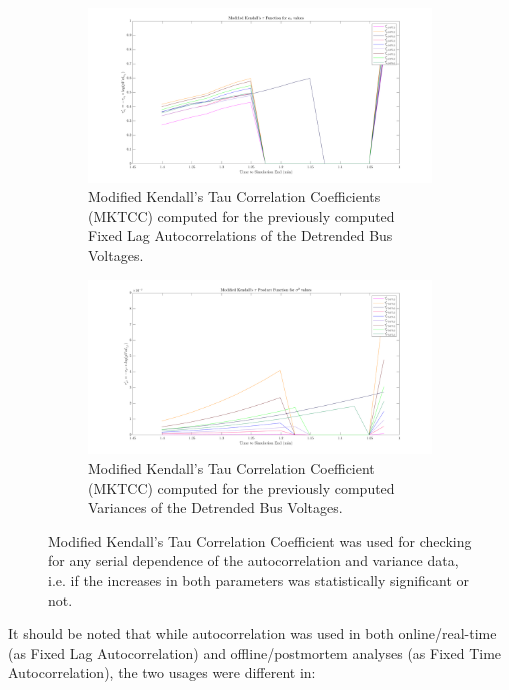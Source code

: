 \begin{figure}[!htpb]
	\begin{subfigure}{\textwidth}
		\centering
		\includegraphics[scale=0.25]{../figures/analysis_matlab/mktcc_ar1_run02}
		\caption{Modified Kendall's Tau Correlation Coefficients (MKTCC) computed for the previously computed Fixed Lag Autocorrelations of the Detrended Bus Voltages.}
	\end{subfigure}
	
	\begin{subfigure}{\textwidth}
		\centering
		\includegraphics[scale=0.25]{../figures/analysis_matlab/mktcc_var_run02}
		\caption{Modified Kendall's Tau Correlation Coefficient (MKTCC) computed for the previously computed Variances of the Detrended Bus Voltages.}
	\end{subfigure}
	
	\caption{Modified Kendall's Tau Correlation Coefficient was used for checking for any serial dependence of the autocorrelation and variance data, i.e. if the increases in both parameters was statistically significant or not.}
\end{figure}

It should be noted that while autocorrelation was used in both online/real-time (as Fixed Lag Autocorrelation) and offline/postmortem analyses (as Fixed Time Autocorrelation), the two usages were different in:


